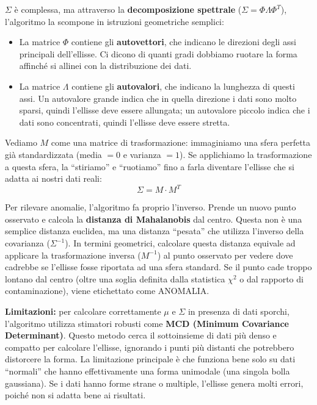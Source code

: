$\Sigma$ è complessa, ma attraverso la
\textbf{decomposizione spettrale} ($\Sigma = \Phi \Lambda
\Phi^T$), l'algoritmo la scompone in istruzioni geometriche
semplici:
\begin{itemize}
    \item La matrice $\Phi$ contiene gli \textbf{autovettori},
          che indicano le direzioni degli assi principali
          dell'ellisse. Ci dicono di quanti gradi dobbiamo
          ruotare la forma affinché si allinei con la
          distribuzione dei dati.
    \item La matrice $\Lambda$ contiene gli \textbf{autovalori},
          che indicano la lunghezza di questi assi. Un autovalore
          grande indica che in quella direzione i dati sono molto
          sparsi, quindi l'ellisse deve essere allungata; un
          autovalore piccolo indica che i dati sono concentrati,
          quindi l'ellisse deve essere stretta.
\end{itemize}

Vediamo $M$ come una matrice di trasformazione: immaginiamo
una sfera perfetta già standardizzata (media $= 0$ e
varianza $= 1$). Se applichiamo la trasformazione a questa
sfera, la ``stiriamo'' e ``ruotiamo'' fino a farla diventare
l'ellisse che si adatta ai nostri dati reali:
\[
    \Sigma = M \cdot M^T
\]

Per rilevare anomalie, l'algoritmo fa proprio l'inverso.
Prende un nuovo punto osservato e calcola la
\textbf{distanza di Mahalanobis} dal centro. Questa non è
una semplice distanza euclidea, ma una distanza ``pesata''
che utilizza l'inverso della covarianza ($\Sigma^{-1}$).
In termini geometrici, calcolare questa distanza equivale
ad applicare la trasformazione inversa ($M^{-1}$) al punto
osservato per vedere dove cadrebbe se l'ellisse fosse
riportata ad una sfera standard. Se il punto cade troppo
lontano dal centro (oltre una soglia definita dalla statistica
$\chi^2$ o dal rapporto di contaminazione), viene etichettato
come ANOMALIA.

\textbf{Limitazioni:} per calcolare correttamente $\mu$ e
$\Sigma$ in presenza di dati sporchi, l'algoritmo utilizza
stimatori robusti come \textbf{MCD (Minimum Covariance
Determinant)}. Questo metodo cerca il sottoinsieme di dati
più denso e compatto per calcolare l'ellisse, ignorando i
punti più distanti che potrebbero distorcere la forma.
La limitazione principale è che funziona bene solo su dati
``normali'' che hanno effettivamente una forma unimodale
(una singola bolla gaussiana). Se i dati hanno forme strane
o multiple, l'ellisse genera molti errori, poiché non si
adatta bene ai risultati.

